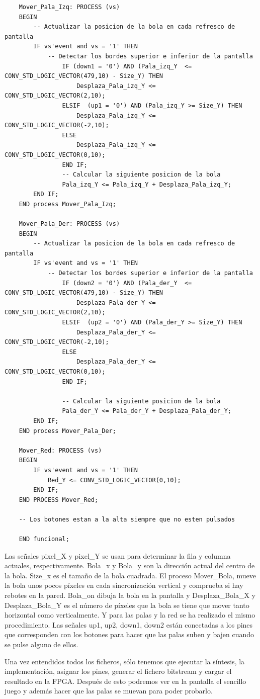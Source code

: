 \begin{lstlisting}
    Mover_Pala_Izq: PROCESS (vs)
    BEGIN
        -- Actualizar la posicion de la bola en cada refresco de pantalla
        IF vs'event and vs = '1' THEN
            -- Detectar los bordes superior e inferior de la pantalla
                IF (down1 = '0') AND (Pala_izq_Y  <= CONV_STD_LOGIC_VECTOR(479,10) - Size_Y) THEN
                    Desplaza_Pala_izq_Y <= CONV_STD_LOGIC_VECTOR(2,10);
                ELSIF  (up1 = '0') AND (Pala_izq_Y >= Size_Y) THEN
                    Desplaza_Pala_izq_Y <= CONV_STD_LOGIC_VECTOR(-2,10);
                ELSE
                    Desplaza_Pala_izq_Y <= CONV_STD_LOGIC_VECTOR(0,10);
                END IF;
                -- Calcular la siguiente posicion de la bola
                Pala_izq_Y <= Pala_izq_Y + Desplaza_Pala_izq_Y;
        END IF;
    END process Mover_Pala_Izq;
    
    Mover_Pala_Der: PROCESS (vs)
    BEGIN
        -- Actualizar la posicion de la bola en cada refresco de pantalla
        IF vs'event and vs = '1' THEN			
            -- Detectar los bordes superior e inferior de la pantalla
                IF (down2 = '0') AND (Pala_der_Y  <= CONV_STD_LOGIC_VECTOR(479,10) - Size_Y) THEN
                    Desplaza_Pala_der_Y <= CONV_STD_LOGIC_VECTOR(2,10);
                ELSIF  (up2 = '0') AND (Pala_der_Y >= Size_Y) THEN
                    Desplaza_Pala_der_Y <= CONV_STD_LOGIC_VECTOR(-2,10);
                ELSE
                    Desplaza_Pala_der_Y <= CONV_STD_LOGIC_VECTOR(0,10);
                END IF;
                
                -- Calcular la siguiente posicion de la bola
                Pala_der_Y <= Pala_der_Y + Desplaza_Pala_der_Y;
        END IF;
    END process Mover_Pala_Der;
    
    Mover_Red: PROCESS (vs)
    BEGIN
        IF vs'event and vs = '1' THEN			
            Red_Y <= CONV_STD_LOGIC_VECTOR(0,10);
        END IF;
    END PROCESS Mover_Red;
    
    -- Los botones estan a la alta siempre que no esten pulsados
    
    END funcional;
\end{lstlisting}

Las señales pixel\_X y pixel\_Y se usan para determinar la fila y columna actuales, respectivamente. Bola\_x y Bola\_y 
son la dirección actual del centro de la bola. Size\_x es el tamaño de la bola cuadrada. El proceso Mover\_Bola, mueve la bola 
unos pocos píxeles en cada sincronización vertical y comprueba si hay rebotes en la pared. Bola\_on dibuja la bola en la 
pantalla y Desplaza\_Bola\_X y Desplaza\_Bola\_Y es el número de píxeles que la bola se tiene que mover tanto horizontal como 
verticalmente. Y para las palas y la red se ha realizado el mismo procedimiento. Las señales up1, up2, down1, down2 están 
conectadas a los pines que corresponden con los botones para hacer que las palas suben y bajen cuando se pulse alguno de 
ellos.

Una vez entendidos todos los ficheros, sólo tenemos que ejecutar la síntesis, la implementación, asignar los pines, generar el 
fichero bitstream y cargar el resultado en la FPGA. Después de esto podremos ver en la pantalla el sencillo juego y además hacer 
que las palas se muevan para poder probarlo.